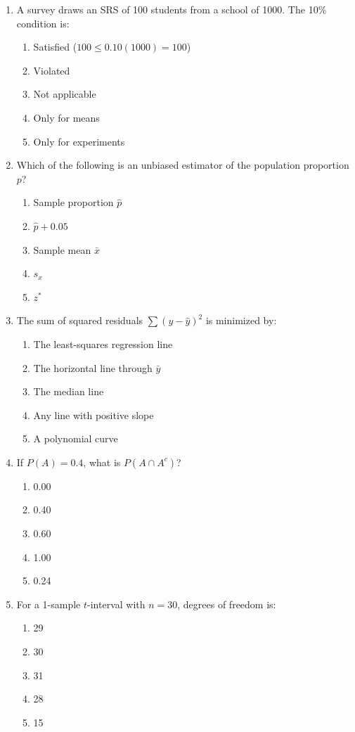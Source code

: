 \begin{enumerate}[resume, leftmargin=1.5em]
  \item A survey draws an SRS of 100 students from a school of 1000. The 10\% condition is:
  \begin{enumerate}[label=(\Alph*)]
    \item Satisfied ($100 \le 0.10(1000) = 100$) \item Violated \item Not applicable \item Only for means \item Only for experiments
  \end{enumerate}

  \item Which of the following is an unbiased estimator of the population proportion $p$?
  \begin{enumerate}[label=(\Alph*)]
    \item Sample proportion $\hat{p}$ \item $\hat{p} + 0.05$ \item Sample mean $\bar{x}$ \item $s_x$ \item $z^*$
  \end{enumerate}

  \item The sum of squared residuals $\sum(y - \hat{y})^2$ is minimized by:
  \begin{enumerate}[label=(\Alph*)]
    \item The least-squares regression line \item The horizontal line through $\bar{y}$ \item The median line \item Any line with positive slope \item A polynomial curve
  \end{enumerate}

  \item If $P(A) = 0.4$, what is $P(A \cap A^c)$?
  \begin{enumerate}[label=(\Alph*)]
    \item 0.00 \item 0.40 \item 0.60 \item 1.00 \item 0.24
  \end{enumerate}

  \item For a 1-sample $t$-interval with $n = 30$, degrees of freedom is:
  \begin{enumerate}[label=(\Alph*)]
    \item 29 \item 30 \item 31 \item 28 \item 15
  \end{enumerate}


\end{enumerate}
